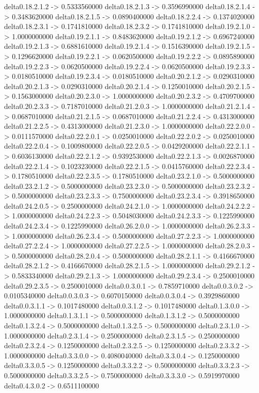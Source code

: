 delta0.18.2.1.2 -> 0.5333560000    delta0.18.2.1.3 -> 0.3596990000    delta0.18.2.1.4 -> 0.3483620000    delta0.18.2.1.5 -> 0.0890400000    delta0.18.2.2.4 -> 0.1374020000    delta0.18.2.3.1 -> 0.1741810000    delta0.18.2.3.2 -> 0.1741810000    delta0.19.2.1.0 -> 1.0000000000    delta0.19.2.1.1 -> 0.8483620000    delta0.19.2.1.2 -> 0.6967240000    delta0.19.2.1.3 -> 0.6881610000    delta0.19.2.1.4 -> 0.1516390000    delta0.19.2.1.5 -> 0.1296620000    delta0.19.2.2.1 -> 0.0620500000    delta0.19.2.2.2 -> 0.0895890000    delta0.19.2.2.3 -> 0.0620500000    delta0.19.2.2.4 -> 0.0620500000    delta0.19.2.3.3 -> 0.0180510000    delta0.19.2.3.4 -> 0.0180510000    delta0.20.2.1.2 -> 0.0290310000    delta0.20.2.1.3 -> 0.0290310000    delta0.20.2.1.4 -> 0.1250010000    delta0.20.2.1.5 -> 0.1563000000    delta0.20.2.3.0 -> 1.0000000000    delta0.20.2.3.2 -> 0.4709700000    delta0.20.2.3.3 -> 0.7187010000    delta0.21.2.0.3 -> 1.0000000000    delta0.21.2.1.4 -> 0.0687010000    delta0.21.2.1.5 -> 0.0687010000    delta0.21.2.2.4 -> 0.4313000000    delta0.21.2.2.5 -> 0.4313000000    delta0.21.2.3.0 -> 1.0000000000    delta0.22.2.0.0 -> 0.0111570000    delta0.22.2.0.1 -> 0.0250010000    delta0.22.2.0.2 -> 0.0250010000    delta0.22.2.0.4 -> 0.1009800000    delta0.22.2.0.5 -> 0.0429200000    delta0.22.2.1.1 -> 0.6036130000    delta0.22.2.1.2 -> 0.9392530000    delta0.22.2.1.3 -> 0.0026870000    delta0.22.2.1.4 -> 0.1023230000    delta0.22.2.1.5 -> 0.0415760000    delta0.22.2.3.4 -> 0.1780510000    delta0.22.2.3.5 -> 0.1780510000    delta0.23.2.1.0 -> 0.5000000000    delta0.23.2.1.2 -> 0.5000000000    delta0.23.2.3.0 -> 0.5000000000    delta0.23.2.3.2 -> 0.5000000000    delta0.23.2.3.3 -> 0.7500000000    delta0.23.2.3.4 -> 0.3918650000    delta0.24.2.0.5 -> 0.2500000000    delta0.24.2.1.0 -> 1.0000000000    delta0.24.2.2.2 -> 1.0000000000    delta0.24.2.2.3 -> 0.5048030000    delta0.24.2.3.3 -> 0.1225990000    delta0.24.2.3.4 -> 0.1225990000    delta0.26.2.0.0 -> 1.0000000000    delta0.26.2.3.3 -> 1.0000000000    delta0.26.2.3.4 -> 0.5000000000    delta0.27.2.2.3 -> 1.0000000000    delta0.27.2.2.4 -> 1.0000000000    delta0.27.2.2.5 -> 1.0000000000    delta0.28.2.0.3 -> 0.5000000000    delta0.28.2.0.4 -> 0.5000000000    delta0.28.2.1.1 -> 0.4166670000    delta0.28.2.1.2 -> 0.4166670000    delta0.28.2.1.5 -> 1.0000000000    delta0.29.2.1.2 -> 0.5833340000    delta0.29.2.1.3 -> 1.0000000000    delta0.29.2.3.4 -> 0.2500010000    delta0.29.2.3.5 -> 0.2500010000    delta0.0.3.0.1 -> 0.7859710000    delta0.0.3.0.2 -> 0.0105340000    delta0.0.3.0.3 -> 0.6070150000    delta0.0.3.0.4 -> 0.3929860000    delta0.0.3.1.1 -> 0.1017480000    delta0.0.3.1.2 -> 0.1017480000    delta0.1.3.0.0 -> 1.0000000000    delta0.1.3.1.1 -> 0.5000000000    delta0.1.3.1.2 -> 0.5000000000    delta0.1.3.2.4 -> 0.5000000000    delta0.1.3.2.5 -> 0.5000000000    delta0.2.3.1.0 -> 1.0000000000    delta0.2.3.1.4 -> 0.2500000000    delta0.2.3.1.5 -> 0.2500000000    delta0.2.3.2.4 -> 0.1250000000    delta0.2.3.2.5 -> 0.1250000000    delta0.2.3.3.2 -> 1.0000000000    delta0.3.3.0.0 -> 0.4080040000    delta0.3.3.0.4 -> 0.1250000000    delta0.3.3.0.5 -> 0.1250000000    delta0.3.3.2.2 -> 0.5000000000    delta0.3.3.2.3 -> 0.5000000000    delta0.3.3.2.5 -> 0.7500000000    delta0.3.3.3.0 -> 0.5919970000    delta0.4.3.0.2 -> 0.6511100000    